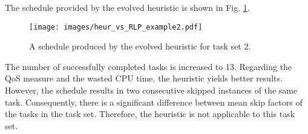 The schedule provided by the evolved heuristic is shown in Fig. \ref{heur_example_2}.
\begin{figure}[ht]
    \centering
    \texttt{[image: images/heur\_vs\_RLP\_example2.pdf]}
    \caption{A schedule produced by the evolved heuristic for task set 2.}
    \label{heur_example_2}
\end{figure}
The number of successfully completed tasks is increased to 13.
Regarding the QoS measure and the wasted CPU time, the heuristic yields better results.
However, the schedule results in two consecutive skipped instances of the same task.
Consequently, there is a significant difference between mean skip factors of the tasks in the task set.
Therefore, the heuristic is not applicable to this task set.


